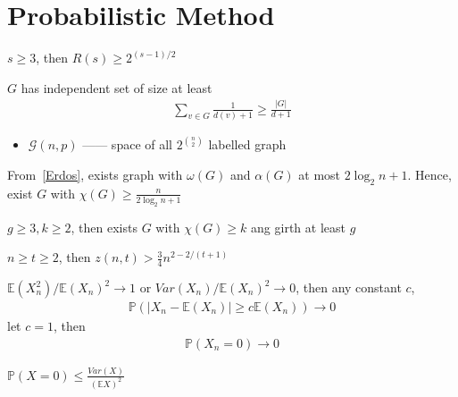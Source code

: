\section{Probabilistic Method}\label{sec:probabilistic-method}

\begin{thm}[Erdos]\label{Erdos}
$s \geq 3$, then $R(s) \geq 2^{(s-1)/2}$
\end{thm}

\begin{thm}
    $G$ has independent set of size at least
    \begin{align*}
        \sum_{v \in G} \frac{1}{d(v) + 1} \geq \frac{|G|}{d + 1}
    \end{align*}
\end{thm}

\begin{itemize}
    \item $\mathcal{G}(n, p)$ ------ space of all $2^{n \choose 2}$ labelled graph
\end{itemize}

\begin{fact}
    From~\ref{Erdos}, exists graph with $\omega(G)$ and $\alpha(G)$ at most $2\log_2 n +1$.
    Hence, exist $G$ with $\chi(G) \geq \frac{n}{2\log_2 n + 1}$
\end{fact}

\begin{thm}[Erdos]
    $g \geq 3, k \geq 2$, then exists $G$ with $\chi(G) \geq k$ ang girth at least $g$
\end{thm}

\begin{thm}
    $n \geq t \geq 2$, then $z(n, t) > \frac{3}{4}n^{2- 2/(t+1)}$
\end{thm}

\begin{lemma}
    $\mathbb{E}(X_n^2) / \mathbb{E}(X_n)^2 \rightarrow 1$ or $Var(X_n) / \mathbb{E}(X_n)^2 \rightarrow 0$, then
    any constant $c$,
    \begin{align*}
        \mathbb{P}(|X_n - \mathbb{E}(X_n)| \geq c\mathbb{E}(X_n)) \rightarrow 0
    \end{align*}
    let $c = 1$, then
    \begin{align*}
        \mathbb{P}(X_n = 0) \rightarrow 0
    \end{align*}
\end{lemma}

\begin{fact}
    $\mathbb{P}(X = 0) \leq \frac{Var(X)}{(\mathbb{E}X)^2}$
\end{fact}

